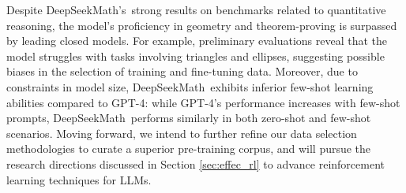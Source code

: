 Despite DeepSeekMath's~strong results on benchmarks related to quantitative reasoning, the model's proficiency in geometry and theorem-proving is surpassed by leading closed models. For example, preliminary evaluations reveal that the model struggles with tasks involving triangles and ellipses, suggesting possible biases in the selection of training and fine-tuning data. Moreover, due to constraints in model size, DeepSeekMath~exhibits inferior few-shot learning abilities compared to GPT-4: while GPT-4's performance increases with few-shot prompts, DeepSeekMath~performs similarly in both zero-shot and few-shot scenarios. Moving forward, we intend to further refine our data selection methodologies to curate a superior pre-training corpus, and will pursue the research directions discussed in Section \ref{sec:effec_rl} to advance reinforcement learning techniques for LLMs.

